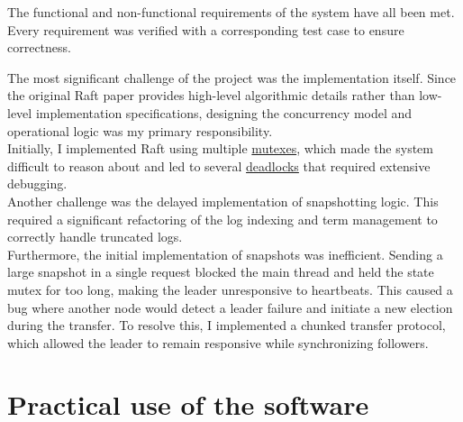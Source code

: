 \documentclass[shortabstract]{iithesis}
\begin{document}
The functional and non-functional requirements of the system have all been met. Every requirement was verified with a corresponding test case to ensure correctness.

The most significant challenge of the project was the implementation itself. Since the original Raft paper provides high-level algorithmic details rather than low-level implementation specifications, designing the concurrency model and operational logic was my primary responsibility. \\
Initially, I implemented Raft using multiple \hyperref[def:mutex]{mutexes}, which made the system difficult to reason about and led to several \hyperref[def:deadlock]{deadlocks} that required extensive debugging. \\
Another challenge was the delayed implementation of snapshotting logic. This required a significant refactoring of the log indexing and term management to correctly handle truncated logs. \\
Furthermore, the initial implementation of snapshots was inefficient. Sending a large snapshot in a single request blocked the main thread and held the state mutex for too long, making the leader unresponsive to heartbeats. This caused a bug where another node would detect a leader failure and initiate a new election during the transfer. To resolve this, I implemented a chunked transfer protocol, which allowed the leader to remain responsive while synchronizing followers.

\section{Practical use of the software}
\end{document}
